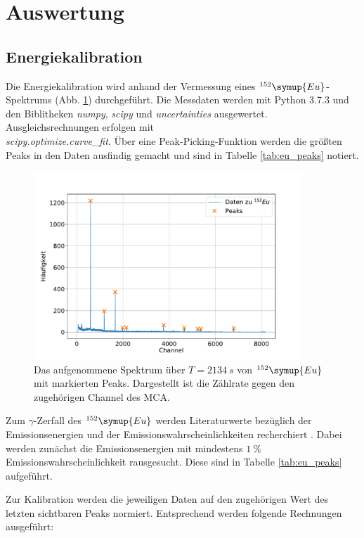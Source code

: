 \section{Auswertung}
\subsection{Energiekalibration}
Die Energiekalibration wird anhand der Vermessung eines $^{152}\symup{Eu}$-Spektrums (Abb. \ref{fig:eu_spectrum}) durchgeführt.
Die Messdaten werden mit Python 3.7.3 und den Biblitheken \textit{numpy}, \textit{scipy} und \textit{uncertainties} ausgewertet.
Ausgleichsrechnungen erfolgen mit \\\textit{scipy.optimize.curve\_fit}.
Über eine Peak-Picking-Funktion werden die größten Peaks in den Daten ausfindig gemacht und sind in Tabelle \ref{tab:eu_peaks} notiert.
\begin{figure}[h!]
  \centering
  \includegraphics[width=0.9\textwidth]{content/images/spektrum_europium.pdf}
  \caption{Das aufgenommene Spektrum über $T=\SI{2134}{s}$ von $^{152}\symup{Eu}$ mit markierten Peaks. Dargestellt ist die Zählrate gegen den zugehörigen Channel des MCA.}
  \label{fig:eu_spectrum}
\end{figure}
Zum $\gamma$-Zerfall des $^{152}\symup{Eu}$ werden Literaturwerte bezüglich der Emissionsenergien und der Emissionswahrscheinlichkeiten recherchiert \cite{nucleide}.
Dabei werden zunächst die Emissionsenergien mit mindestens $\SI{1}{\%}$ Emissionswahrscheinlichkeit rausgesucht.
Diese sind in Tabelle \ref{tab:eu_peaks} aufgeführt.

Zur Kalibration werden die jeweiligen Daten auf den zugehörigen Wert des letzten sichtbaren Peaks normiert.
Entsprechend werden folgende Rechnungen ausgeführt:
